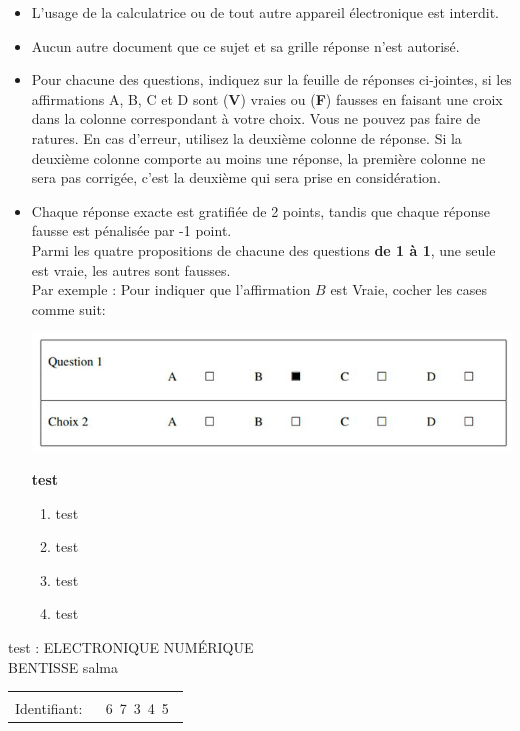 \documentclass{book}%
\begin{document}
\begin{itemize}%
\item%
L'usage de la calculatrice ou de tout autre appareil électronique est interdit.%
\item%
Aucun autre document que ce sujet et sa grille réponse n'est autorisé.%
\item%
Pour chacune des questions, indiquez sur la feuille de réponses ci-jointes, si les affirmations A, B, C et D sont (\textbf{V}) vraies ou (\textbf{F}) fausses en faisant une croix dans la colonne correspondant à votre choix. Vous ne pouvez pas faire de ratures. En cas d'erreur, utilisez la deuxième colonne de réponse. Si la deuxième colonne comporte au moins une réponse, la première colonne ne sera pas corrigée, c'est la deuxième qui sera prise en considération.%
\item%
Chaque réponse exacte est gratifiée de 2 points, tandis que chaque réponse fausse est pénalisée par -1 point. \\ 	Parmi les quatre propositions de chacune des questions \textbf{de 1 à 1}, une seule est vraie, les autres sont fausses. \\ 	Par exemple : Pour indiquer que l'affirmation $B$ est Vraie, cocher les cases comme suit:  \\ \begin{center}	\includegraphics[scale=0.8]{reponses.png} \end{center}%
\thispagestyle{empty}%
\begin{exercise}%
\textbf{test }%
\begin{enumerate}[label=\textbf{\Alph*. }]%
\item%
test%
\item%
test%
\item%
test%
\item%
test%
\end{enumerate}%
\end{exercise}%
\end{itemize}%
\newpage%
\thispagestyle{empty}%
test : ELECTRONIQUE NUMÉRIQUE $\qquad \qquad \qquad \qquad \qquad \qquad \qquad \qquad$ BENTISSE salma%
\begin{flushright}%
\begin{tabular}{|l|}%
\hline%
 \\%
\thispagestyle{empty}%
Identifiant: $\quad$ {\Large 6~7~3~4~5~}%
 \\%
\hline%
\end{tabular}%
\end{flushright}%
\end{document}
